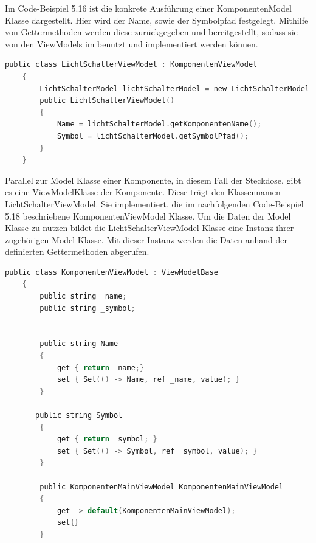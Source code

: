 Im Code-Beispiel 5.16 ist die konkrete Ausführung einer KomponentenModel Klasse dargestellt. Hier wird der Name, sowie der Symbolpfad festgelegt. Mithilfe von Gettermethoden werden diese zurückgegeben und bereitgestellt, sodass sie von den ViewModels im benutzt und implementiert werden können.
\begin{lstlisting}[language=C,
    frame=single,           % Ein Rahmen um den Code
    framexleftmargin=15pt,  % Rahmen link von den Zahlen
    style=algoBericht,
    label={LichtSchalterViewModel},
    captionpos=b,           % Caption unter den Code setzen
    caption={LichtSchalterViewModel}]
    public class LichtSchalterViewModel : KomponentenViewModel
    {
        LichtSchalterModel lichtSchalterModel = new LichtSchalterModel();
        public LichtSchalterViewModel()
        {
            Name = lichtSchalterModel.getKomponentenName();
            Symbol = lichtSchalterModel.getSymbolPfad();
        }
    }
\end{lstlisting}
Parallel zur Model Klasse einer Komponente, in diesem Fall der Steckdose, gibt es eine ViewModelKlasse der Komponente. Diese trägt den Klassennamen LichtSchalterViewModel. Sie implementiert, die im nachfolgenden Code-Beispiel 5.18 beschriebene KomponentenViewModel Klasse. Um die Daten der Model Klasse zu nutzen bildet die LichtSchalterViewModel Klasse eine Instanz ihrer zugehörigen Model Klasse. Mit dieser Instanz werden die Daten anhand der definierten Gettermethoden abgerufen. 
\pagebreak
\begin{lstlisting}[language=C,
    frame=single,           % Ein Rahmen um den Code
    framexleftmargin=15pt,  % Rahmen link von den Zahlen
    style=algoBericht,
    label={KomponentenViewModel},
    captionpos=b,           % Caption unter den Code setzen
    caption={KomponentenViewModel}]
    public class KomponentenViewModel : ViewModelBase
    {
        public string _name;
        public string _symbol;


        public string Name
        {
            get { return _name;}
            set { Set(() -> Name, ref _name, value); }
        }

       public string Symbol
        {
            get { return _symbol; }
            set { Set(() -> Symbol, ref _symbol, value); }
        }

        public KomponentenMainViewModel KomponentenMainViewModel
        {
            get -> default(KomponentenMainViewModel);
            set{}
        }
\end{lstlisting}
